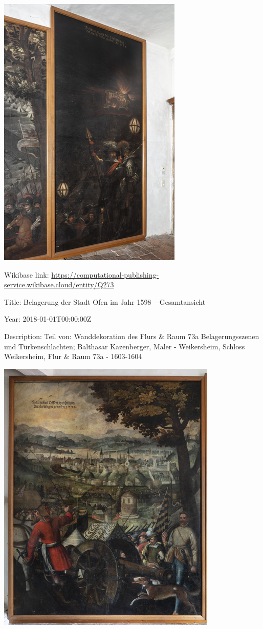 \documentclass[
  letterpaper,
]{book}
\begin{document}
\includegraphics{paintings_files/figure-pdf/cell-3-output-94.png}

Wikibase link:
\url{https://computational-publishing-service.wikibase.cloud/entity/Q273}

Title: Belagerung der Stadt Ofen im Jahr 1598 -- Gesamtansicht

Year: 2018-01-01T00:00:00Z

Description: Teil von: Wanddekoration des Flurs \& Raum 73a
Belagerungsszenen und Türkenschlachten; Balthasar Kazenberger, Maler -
Weikersheim, Schloss Weikersheim, Flur \& Raum 73a - 1603-1604

\includegraphics{paintings_files/figure-pdf/cell-3-output-96.png}
\end{document}
